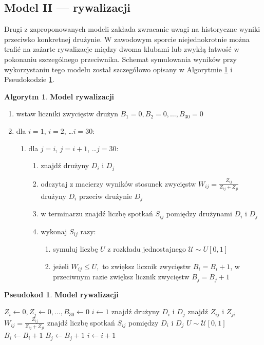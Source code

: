 \documentclass[inzynierska]{pwr_wmat_praca_dyplomowa}
\theoremstyle{plain}
\numberwithin{theorem}{chapter}
\theoremstyle{definition}
\numberwithin{theorem}{chapter}
\newtheorem{algorytm}[theorem]{Algorytm}
\newtheorem{pseudokod}[theorem]{Pseudokod}
\begin{document}
\subsection{Model II --- rywalizacji}
Drugi z zaproponowanych modeli zakłada zwracanie uwagi na historyczne wyniki przeciwko konkretnej drużynie. W zawodowym sporcie niejednokrotnie można trafić na zażarte rywalizacje między dwoma klubami lub zwykłą łatwość w pokonaniu szczególnego przeciwnika. Schemat symulowania wyników przy wykorzystaniu tego modelu został szczegółowo opisany w Algorytmie \ref{algorytm2} i Pseudokodzie \ref{pseudokod2}.

\begin{algorytm} \label{algorytm2}
	\textbf{Model rywalizacji}
	\begin{enumerate}
		\item wstaw liczniki zwycięstw drużyn $B_1= 0,B_2= 0,\dots, B_{30}= 0$
		\item dla $i=1$, $i=2$, \dots $i=30$: 
		\begin{enumerate}
			\item dla $j=i$, $j=i+1$, \dots $j=30$: 
			\begin{enumerate}
				\item znajdź drużyny $D_i$ i $D_j$
				\item odczytaj z macierzy wyników stosunek zwycięstw $W_{ij}=\frac{Z_{ij}}{Z_{ij}+Z_{ji}}$ drużyny $D_i$ przeciw drużynie $D_j$   
				\item w terminarzu znajdź liczbę spotkań $S_{ij}$ pomiędzy drużynami $D_i$ i $D_j$
				\item wykonaj $S_{ij}$ razy:
				\begin{enumerate}
					\item symuluj liczbę $U$ z rozkładu jednostajnego $\mathcal{U}\sim U[0,1]$ 
					\item jeżeli $W_{ij} \leq U,$ to zwiększ licznik zwycięstw $B_i=B_i+1$, w przeciwnym razie zwiększ licznik zwycięstw $B_j=B_j+1$
				\end{enumerate}
			\end{enumerate}
		\end{enumerate}
	\end{enumerate}
\end{algorytm} 

\begin{pseudokod} \label{pseudokod2}
	\textbf{Model rywalizacji}
	\begin{algorithmic}[1]
		\State $Z_i\gets 0,Z_j\gets 0,\dots, B_{30}\gets 0$
		\State $i\gets 1$
		\State znajdź drużyny $D_i$ i $D_j$
		\State znajdź $Z_{ij}$ i $Z_{ji}$ 
		\State $W_{ij}=\frac{Z_{ij}}{Z_{ij}+Z_{ji}}$
		\State znajdź liczbę spotkań $S_{ij}$ pomiędzy $D_i$ i $D_j$
		\State $U\sim \mathcal{U}[0,1]$
		\State $B_i \gets B_i+1$
		\Else
		\State $B_j \gets B_j+1$
		\EndIf
		\EndFor
		\EndFor
		\State $i\gets i+1$
		\EndWhile
	\end{algorithmic}
\end{pseudokod}
\end{document}
